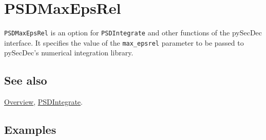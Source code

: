 \documentclass[../FeynHelpersManual.tex]{subfiles}
\begin{document}
\hypertarget{psdmaxepsrel}{
\section{PSDMaxEpsRel}\label{psdmaxepsrel}}

\texttt{PSDMaxEpsRel} is an option for \texttt{PSDIntegrate} and other
functions of the pySecDec interface. It specifies the value of the
\texttt{max_epsrel} parameter to be passed to pySecDec's numerical
integration library.

\subsection{See also}

\hyperlink{toc}{Overview}, \hyperlink{psdintegrate}{PSDIntegrate}.

\subsection{Examples}
\end{document}
